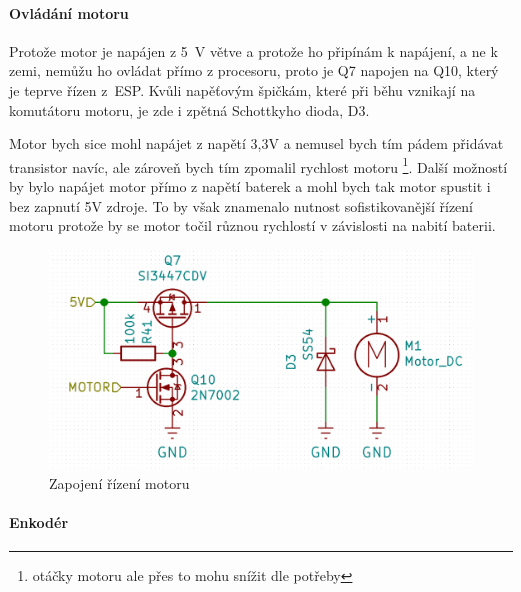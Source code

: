\paragraph{Ovládání motoru}
Protože motor je napájen z 5~V větve a protože ho připínám k napájení, a ne k zemi, nemůžu ho ovládat přímo z procesoru, proto je Q7 napojen na Q10, který je teprve řízen z~ESP. 
Kvůli napěťovým špičkám, které při běhu vznikají na komutátoru motoru, je zde i zpětná Schottkyho dioda, D3.

Motor bych sice mohl napájet z napětí 3,3V a nemusel bych tím pádem přidávat transistor navíc, ale zároveň bych tím zpomalil rychlost motoru %
\footnote{otáčky motoru ale přes to mohu snížit dle potřeby}.
Další možností by bylo napájet motor přímo z napětí baterek a mohl bych tak motor spustit i bez zapnutí 5V zdroje. To by však znamenalo nutnost 
sofistikovanější řízení motoru protože by se motor točil různou rychlostí v závislosti na nabití baterii.

\begin{figure}[htbp]
    \centering
    \includegraphics[width=\textwidth]{kapitoly/obrazky/E4/ir_motor_enkoder/ovladani_motoru.png}
    \caption{Zapojení řízení motoru}
    \label{fig:E4-motor}
\end{figure}

\newpage

\paragraph{Enkodér}

